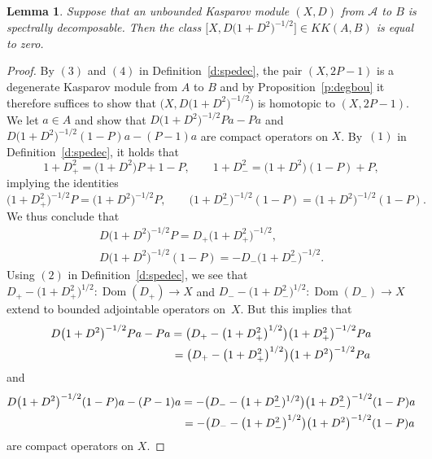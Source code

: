 \documentclass[pdftex]{sigma}
\numberwithin{equation}{section}
\newtheorem{lem}[Theorem]{Lemma}
\newcommand{\s}[1]{\mathscr{#1}}
\begin{document}
\begin{lem}\label{l:spezer}
Suppose that an unbounded Kasparov module $(X,D)$ from $\s A$ to $B$ is spectrally decomposable. Then the class $\big[X,D\big(1 + D^2\big)^{-1/2}\big] \in KK(A,B)$ is equal to zero.
\end{lem}
\begin{proof}By $(3)$ and $(4)$ in Definition~\ref{d:spedec}, the pair $(X, 2 P - 1)$ is a degenerate Kasparov module from $A$ to $B$ and by Proposition~\ref{p:degbou} it therefore suffices to show that $\big(X,D\big(1 + D^2\big)^{-1/2}\big)$ is homotopic to $(X, 2P - 1)$. We let $a \in A$ and show that $D\big(1 + D^2\big)^{-1/2} P a - P a$ and $D\big(1 + D^2\big)^{-1/2}(1 - P) a - (P - 1) a$ are compact operators on $X$. By~$(1)$ in Definition~\ref{d:spedec}, it holds that
\[
1 + D_+^2 = \big(1 + D^2\big) P + 1 - P , \qquad 1 + D_-^2 = \big(1 + D^2\big)(1 - P) + P ,
\]
implying the identities
\[
\big(1 + D_+^2 \big)^{-1/2}P = \big(1 + D^2\big)^{-1/2} P , \qquad \big(1 + D_-^2\big)^{-1/2}(1-P) = \big(1 + D^2\big)^{-1/2} (1 - P) .
\]
We thus conclude that
\begin{gather*}
D\big(1 + D^2\big)^{-1/2} P = D_+ \big(1 + D_+^2\big)^{-1/2} , \\ D \big(1 + D^2\big)^{-1/2} (1 - P) = - D_- \big(1 + D_-^2 \big)^{-1/2} .
\end{gather*}
Using $(2)$ in Definition~\ref{d:spedec}, we see that $D_+ - \big(1 + D_+^2\big)^{1/2}\colon \operatorname{Dom}(D_+) \to X$ and $D_- - \big(1 + D_-^2 \big)^{1/2}\colon \operatorname{Dom}( D_-) \to X$ extend to bounded adjointable operators on~$X$. But this implies that
\begin{gather*}
 D\big(1 + D^2\big)^{-1/2} P a - P a = \big(D_+ - \big(1 + D_+^2\big)^{1/2}\big)\big(1 + D_+^2\big)^{-1/2} P a \\
\hphantom{D\big(1 + D^2\big)^{-1/2} P a - P a}{} = \big(D_+ - \big(1 + D_+^2\big)^{1/2}\big) \big(1 + D^2\big)^{-1/2} P a
\end{gather*}
and
\begin{gather*}
D\big(1 + D^2\big)^{-1/2} (1 - P) a - (P-1) a = - \big(D_- - \big(1 + D_-^2)^{1/2}\big)\big(1 + D_-^2\big)^{-1/2} (1 - P) a \\
\hphantom{D\big(1 + D^2\big)^{-1/2} (1 - P) a - (P-1) a}{} = -\big(D_- - \big(1 + D_-^2\big)^{1/2}\big) \big(1 + D^2\big)^{-1/2} (1 - P) a
\end{gather*}
are compact operators on $X$.
\end{proof}
\end{document}
